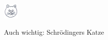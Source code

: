 \documentclass[6pt,a4paper]{scrartcl}
\begin{document}
\begin{multicols}{4}
	
	
	
	

	

 \parbox{2.0cm}{
\includegraphics[height=0.8cm]{img/cat.jpg}
}
\parbox{4.0cm}{
	Auch wichtig: Schrödingers Katze
}


\end{multicols}

\end{document}
